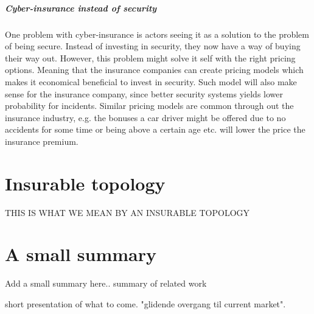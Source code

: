 \subparagraph{Cyber-insurance instead of security}
One problem with cyber-insurance is actors seeing it as a solution to the problem of being secure. Instead of investing in security, they now have a way of buying their way out. 
However, this problem might solve it self with the right pricing options. Meaning that the insurance companies can create pricing models which makes it economical beneficial to invest in security. Such model will also make sense for the insurance company, since better security systems yields lower probability for incidents.
Similar pricing models are common through out the insurance industry, e.g. the bonuses a car driver might be offered due to no accidents for some time or being above a certain age etc. will lower the price the insurance premium.  

\section{Insurable topology}
THIS IS WHAT WE MEAN BY AN INSURABLE TOPOLOGY 


\section{A small summary}
Add a small summary here..
summary of related work  

short presentation of what to come. "glidende overgang til current market".






